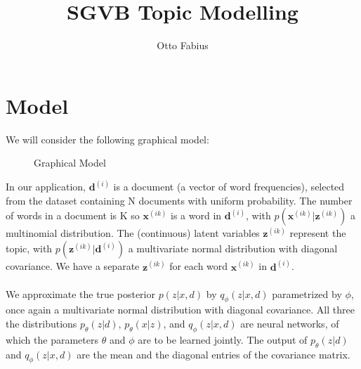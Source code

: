 \documentclass{article}
\author{Otto Fabius}
\title{SGVB Topic Modelling}
\begin{document}
\maketitle

\section{Model}

We will consider the following graphical model:

\begin{figure}[ht]
  \begin{center}
  \end{center}
\caption{Graphical Model}
\label{sgvb}
\end{figure}

In our application, $\mathbf{d}^{(i)}$ is a document (a vector of word frequencies), selected from the dataset containing N documents with uniform probability. The number of words in a document is K so $\mathbf{x}^{(ik)}$ is a word in $\mathbf{d}^{(i)}$, with $p(\mathbf{x}^{(ik)}|\mathbf{z}^{(ik)})$ a multinomial distribution. The (continuous) latent variables $\mathbf{z}^{(ik)}$ represent the topic, with $p(\mathbf{z}^{(ik)}|\mathbf{d}^{(i)})$ a multivariate normal distribution with diagonal covariance. We have a separate $\mathbf{z}^{(ik)}$ for each word $\mathbf{x}^{(ik)}$ in $\mathbf{d}^{(i)}$.\\ \\
We approximate the true posterior $p(z|x,d)$ by $q_\phi(z|x,d)$ parametrized by $\phi$, once again a multivariate normal distribution with diagonal covariance. All three the distributions $p_\theta(z|d)$, $p_\theta(x|z)$, and $q_\phi(z|x,d)$ are neural networks, of which the parameters $\theta$ and $\phi$ are to be learned jointly. The output of $p_\theta(z|d)$ and $q_\phi(z|x,d)$ are the mean and the diagonal entries of the covariance matrix.\\ 
\end{document}

